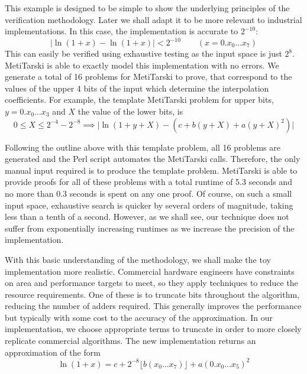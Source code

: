 \documentclass[a4]{article}
\newcommand{\abs}[1]{\lvert#1\rvert}
\begin{document}
This example is designed to be simple to show the underlying principles of the verification methodology. Later we shall adapt it to be more relevant to industrial implementations. In this case, the implementation is accurate to $2^{-10}$:
$$\abs{\ln(1+x)-\overline{\ln(1+x)}} <2^{-10} \qquad (x= 0.x_0...x_7) $$
This can easily be verified using exhaustive testing as the input space is just $2^8$. MetiTarski is able to exactly model this implementation with no errors. We generate a total of 16 problems for MetiTarski to prove, that correspond to the values of the upper 4 bits of the input which determine the interpolation coefficients. For example, the template MetiTarski problem for upper bits, $y=0.x_0...x_3$ and $X$ the value of the lower bits, is
$$ 0\le X \le 2^{-4}-2^{-8} \implies \abs{\ln(1+y+X)-(c+b(y+X)+a(y+X)^2)} $$

Following the outline above with this template problem, all 16 problems are generated and the Perl script automates the MetiTarski calls. Therefore, the only manual input required is to produce the template problem. MetiTarski is able to provide proofs for all of these problems with a total runtime of 5.3 seconds and no more than 0.3 seconds is spent on any one proof. Of course, on such a small input space, exhaustive search is quicker by several orders of magnitude, taking less than a tenth of a second. However, as we shall see, our technique does not suffer from exponentially increasing runtimes as we increase the precision of the implementation.

With this basic understanding of the methodology, we shall make the toy implementation more realistic. Commercial hardware engineers have constraints on area and performance targets to meet, so they apply techniques to reduce the resource requirements. One of these is to truncate bits throughout the algorithm, reducing the number of adders required. This generally improves the performance but typically with some cost to the accuracy of the approximation. In our implementation, we choose appropriate terms to truncate in order to more closely replicate commercial algorithms. The new implementation returns an approximation of the form 
$$ \overline{\ln(1+x)}=c + 2^{-8} \lfloor{b(x_0...x_7)} \rfloor +a(0.x_0...x_5)^2 $$
\end{document}
